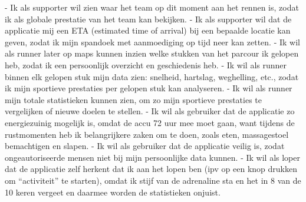 \documentclass[../main.tex]{subfiles}
\begin{document}
    - Ik als supporter wil zien waar het team op dit moment aan het rennen is, zodat ik als globale
    prestatie van het team kan bekijken.
    - Ik als supporter wil dat de applicatie mij een ETA (estimated time of arrival) bij een bepaalde locatie
    kan geven, zodat ik mijn spandoek met aanmoediging op tijd neer kan zetten.
    - Ik wil als runner later op maps kunnen inzien welke stukken van het parcour ik gelopen heb, zodat ik
    een persoonlijk overzicht en geschiedenis heb.
    - Ik wil als runner binnen elk gelopen stuk mijn data zien: snelheid, hartslag, weghelling, etc., zodat ik
    mijn sportieve prestaties per gelopen stuk kan analyseren.
    - Ik wil als runner mijn totale statistieken kunnen zien, om zo mijn sportieve prestaties te vergelijken
    of nieuwe doelen te stellen.
    - Ik wil als gebruiker dat de applicatie zo energiezuinig mogelijk is, omdat de accu 72 uur mee moet
    gaan, want tijdens de rustmomenten heb ik belangrijkere zaken om te doen, zoals eten,
    massagestoel bemachtigen en slapen.
    - Ik wil als gebruiker dat de applicatie veilig is, zodat ongeautoriseerde mensen niet bij mijn
    persoonlijke data kunnen.
    - Ik wil als loper dat de applicatie zelf herkent dat ik aan het lopen ben (ipv op een knop drukken om
    “activiteit” te starten), omdat ik stijf van de adrenaline sta en het in 8 van de 10 keren vergeet en
    daarmee worden de statistieken onjuist.
\end{document}
